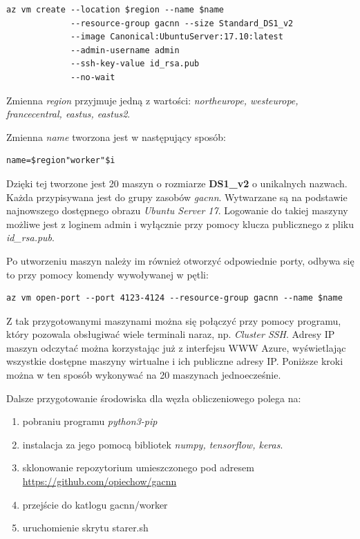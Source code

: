 \begin{lstlisting}
az vm create --location $region --name $name
             --resource-group gacnn --size Standard_DS1_v2
             --image Canonical:UbuntuServer:17.10:latest
             --admin-username admin
             --ssh-key-value id_rsa.pub
             --no-wait
\end{lstlisting}

Zmienna \textit{region} przyjmuje jedną z wartości: \textit{northeurope, westeurope, francecentral, eastus, eastus2}.

Zmienna \textit{name} tworzona jest w następujący sposób:

\begin{lstlisting}
name=$region"worker"$i
\end{lstlisting}

Dzięki tej tworzone jest 20 maszyn o rozmiarze \textbf{DS1\_v2} o unikalnych nazwach.
Każda przypisywana jest do grupy zasobów \textit{gacnn}.
Wytwarzane są na podstawie najnowszego dostępnego obrazu \textit{Ubuntu Server 17}.
Logowanie do takiej maszyny możliwe jest z loginem admin i wyłącznie przy pomocy klucza publicznego z pliku \textit{id\_rsa.pub}.

Po utworzeniu maszyn należy im również otworzyć odpowiednie porty, odbywa się to przy pomocy komendy wywoływanej w pętli:
\begin{lstlisting}
az vm open-port --port 4123-4124 --resource-group gacnn --name $name
\end{lstlisting}

Z tak przygotowanymi maszynami można się połączyć przy pomocy programu, który pozowala obsługiwać wiele terminali naraz, np. \textit{Cluster SSH}.
Adresy IP maszyn odczytać można korzystając już z interfejsu WWW Azure, wyświetlając wszystkie dostępne maszyny wirtualne i ich publiczne adresy IP.
Poniższe kroki można w ten sposób wykonywać na 20 maszynach jednoecześnie.

Dalsze przygotowanie środowiska dla węzła obliczeniowego polega na:
\begin{enumerate}
  \item pobraniu programu \textit{python3-pip}
  \item instalacja za jego pomocą bibliotek \textit{numpy, tensorflow, keras}.
  \item sklonowanie repozytorium umieszczonego pod adresem \url{https://github.com/opiechow/gacnn}
  \item przejście do katlogu gacnn/worker
  \item uruchomienie skrytu starer.sh
\end{enumerate}

